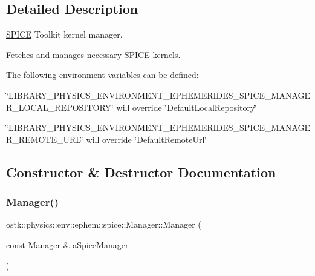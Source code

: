 \subsection{Detailed Description}
\hyperlink{classostk_1_1physics_1_1env_1_1ephem_1_1_s_p_i_c_e}{S\+P\+I\+CE} Toolkit kernel manager. 

Fetches and manages necessary \hyperlink{classostk_1_1physics_1_1env_1_1ephem_1_1_s_p_i_c_e}{S\+P\+I\+CE} kernels.

The following environment variables can be defined\+:


\begin{DoxyItemize}
\item \char`\"{}\+L\+I\+B\+R\+A\+R\+Y\+\_\+\+P\+H\+Y\+S\+I\+C\+S\+\_\+\+E\+N\+V\+I\+R\+O\+N\+M\+E\+N\+T\+\_\+\+E\+P\+H\+E\+M\+E\+R\+I\+D\+E\+S\+\_\+\+S\+P\+I\+C\+E\+\_\+\+M\+A\+N\+A\+G\+E\+R\+\_\+\+L\+O\+C\+A\+L\+\_\+\+R\+E\+P\+O\+S\+I\+T\+O\+R\+Y\char`\"{} will override \char`\"{}\+Default\+Local\+Repository\char`\"{}
\item \char`\"{}\+L\+I\+B\+R\+A\+R\+Y\+\_\+\+P\+H\+Y\+S\+I\+C\+S\+\_\+\+E\+N\+V\+I\+R\+O\+N\+M\+E\+N\+T\+\_\+\+E\+P\+H\+E\+M\+E\+R\+I\+D\+E\+S\+\_\+\+S\+P\+I\+C\+E\+\_\+\+M\+A\+N\+A\+G\+E\+R\+\_\+\+R\+E\+M\+O\+T\+E\+\_\+\+U\+R\+L\char`\"{} will override \char`\"{}\+Default\+Remote\+Url\char`\"{} 
\end{DoxyItemize}

\subsection{Constructor \& Destructor Documentation}
\mbox{\label{classostk_1_1physics_1_1env_1_1ephem_1_1spice_1_1_manager_a20d663efed8e9d8604c8b86d055e905b}} 
\subsubsection{\texorpdfstring{Manager()}{Manager()}}
{\footnotesize\ttfamily ostk\+::physics\+::env\+::ephem\+::spice\+::\+Manager\+::\+Manager (\begin{DoxyParamCaption}\item[{const \hyperlink{classostk_1_1physics_1_1env_1_1ephem_1_1spice_1_1_manager}{Manager} \&}]{a\+Spice\+Manager }\end{DoxyParamCaption})\hspace{0.3cm}{\ttfamily [delete]}}



